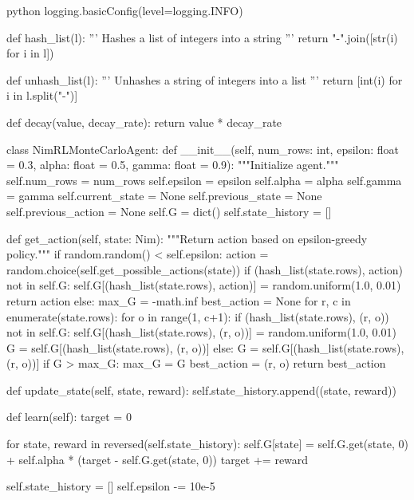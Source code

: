 \begin{mintedbox}{python}
logging.basicConfig(level=logging.INFO)

def hash_list(l):
    '''
    Hashes a list of integers into a string
    '''
    return "-".join([str(i) for i in l])


def unhash_list(l):
    '''
    Unhashes a string of integers into a list
    '''
    return [int(i) for i in l.split("-")]


def decay(value, decay_rate):
    return value * decay_rate


class NimRLMonteCarloAgent:
    def __init__(self, num_rows: int, epsilon: float = 0.3, alpha: float = 0.5, gamma: float = 0.9):
        """Initialize agent."""
        self.num_rows = num_rows
        self.epsilon = epsilon
        self.alpha = alpha
        self.gamma = gamma
        self.current_state = None
        self.previous_state = None
        self.previous_action = None
        self.G = dict()
        self.state_history = []

    def get_action(self, state: Nim):
        """Return action based on epsilon-greedy policy."""
        if random.random() < self.epsilon:
            action = random.choice(self.get_possible_actions(state))
            if (hash_list(state.rows), action) not in self.G:
                self.G[(hash_list(state.rows), action)] = random.uniform(1.0, 0.01)
            return action
        else:
            max_G = -math.inf
            best_action = None
            for r, c in enumerate(state.rows):
                for o in range(1, c+1):
                    if (hash_list(state.rows), (r, o)) not in self.G:
                        self.G[(hash_list(state.rows), (r, o))] = random.uniform(1.0, 0.01)
                        G = self.G[(hash_list(state.rows), (r, o))]
                    else:
                        G = self.G[(hash_list(state.rows), (r, o))]
                    if G > max_G:
                        max_G = G
                        best_action = (r, o)
            return best_action

    def update_state(self, state, reward):
        self.state_history.append((state, reward))

    def learn(self):
        target = 0

        for state, reward in reversed(self.state_history):
            self.G[state] = self.G.get(state, 0) + self.alpha * (target - self.G.get(state, 0))
            target += reward

        self.state_history = []
        self.epsilon -= 10e-5


\end{mintedbox}
